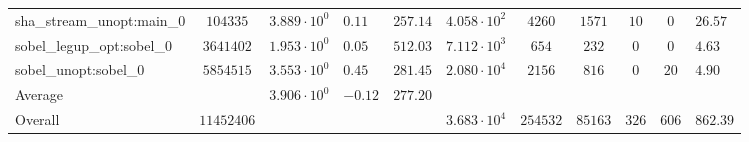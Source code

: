 \begin{tabular}{|l|c|HHc|c|c|c|c|cH|}
sha\_stream\_unopt:main\_0                      & $ 104335   $ & $ 3.889 \cdot 10^{0} $ & $ 0.11  $ & $ 257.14 $ & $ 4.058 \cdot 10^{2}  $ & $ 4260   $ & $ 1571  $ & $ 10  $ & $ 0   $ & $ 26.57   $ \\
sobel\_legup\_opt:sobel\_0                      & $ 3641402  $ & $ 1.953 \cdot 10^{0} $ & $ 0.05  $ & $ 512.03 $ & $ 7.112 \cdot 10^{3}  $ & $ 654    $ & $ 232   $ & $ 0   $ & $ 0   $ & $ 4.63    $ \\
sobel\_unopt:sobel\_0                           & $ 5854515  $ & $ 3.553 \cdot 10^{0} $ & $ 0.45  $ & $ 281.45 $ & $ 2.080 \cdot 10^{4}  $ & $ 2156   $ & $ 816   $ & $ 0   $ & $ 20  $ & $ 4.90    $ \\
\hline
Average                                         & $          $ & $ 3.906 \cdot 10^{0} $ & $ -0.12 $ & $ 277.20 $ & $                     $ & $        $ & $       $ & $     $ & $     $ & $         $ \\
\hline
Overall                                         & $ 11452406 $ & $                    $ & $       $ & $        $ & $ 3.683 \cdot 10^{4}  $ & $ 254532 $ & $ 85163 $ & $ 326 $ & $ 606 $ & $ 862.39  $ \\
\hline
\end{tabular}
